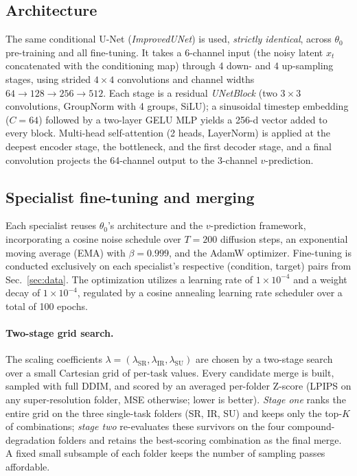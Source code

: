\documentclass{article}
\begin{document}
\subsection{Architecture}

The same conditional U-Net (\emph{ImprovedUNet}) is used, \emph{strictly identical}, across $\theta_0$ pre-training and all fine-tuning. It takes a 6-channel input (the noisy latent $x_t$ concatenated with the conditioning map) through 4 down- and 4 up-sampling stages, using strided $4\times4$ convolutions and channel widths $64\!\to\!128\!\to\!256\!\to\!512$. Each stage is a residual \emph{UNetBlock} (two $3\times3$ convolutions, GroupNorm with 4 groups, SiLU); a sinusoidal timestep embedding ($C=64$) followed by a two-layer GELU MLP yields a 256-d vector added to every block. Multi-head self-attention (2 heads, LayerNorm) is applied at the deepest encoder stage, the bottleneck, and the first decoder stage, and a final convolution projects the 64-channel output to the 3-channel $v$-prediction.

\subsection{Specialist fine-tuning and merging}
\label{sec:specialists}

Each specialist reuses $\theta_0$'s architecture and the $v$-prediction framework, incorporating a cosine noise schedule over $T = 200$ diffusion steps, an exponential moving average (EMA) with $\beta=0.999$, and the AdamW optimizer. Fine-tuning is conducted exclusively on each specialist's respective (condition, target) pairs from Sec.~\ref{sec:data}. The optimization utilizes a learning rate of $1 \times 10^{-4}$ and a weight decay of $1 \times 10^{-4}$, regulated by a cosine annealing learning rate scheduler over a total of 100 epochs.

\paragraph*{Two-stage grid search.} The scaling coefficients $\lambda=(\lambda_{\mathrm{SR}},\lambda_{\mathrm{IR}},\lambda_{\mathrm{SU}})$ are chosen by a two-stage search over a small Cartesian grid of per-task values. Every candidate merge is built, sampled with full DDIM, and scored by an averaged per-folder Z-score (LPIPS on any super-resolution folder, MSE otherwise; lower is better). \emph{Stage one} ranks the entire grid on the three single-task folders (SR, IR, SU) and keeps only the top-$K$ of combinations; \emph{stage two} re-evaluates these survivors on the four compound-degradation folders and retains the best-scoring combination as the final merge. A fixed small subsample of each folder keeps the number of sampling passes affordable.
\end{document}
